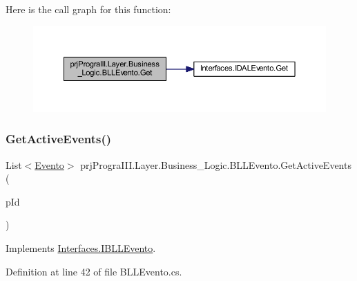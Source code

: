 Here is the call graph for this function\+:
\nopagebreak
\begin{figure}[H]
\begin{center}
\leavevmode
\includegraphics[width=350pt]{classprj_progra_i_i_i_1_1_layer_1_1_business___logic_1_1_b_l_l_evento_a7aeead199812f2510ee3087a7d022c4e_cgraph}
\end{center}
\end{figure}
\hypertarget{classprj_progra_i_i_i_1_1_layer_1_1_business___logic_1_1_b_l_l_evento_a72838525485eaff7c98c698dac7e5f71}{}\label{classprj_progra_i_i_i_1_1_layer_1_1_business___logic_1_1_b_l_l_evento_a72838525485eaff7c98c698dac7e5f71} 
\subsubsection{\texorpdfstring{Get\+Active\+Events()}{GetActiveEvents()}}
{\footnotesize\ttfamily List$<$\hyperlink{classprj_progra_i_i_i_1_1_layer_1_1_entities_1_1_evento}{Evento}$>$ prj\+Progra\+I\+I\+I.\+Layer.\+Business\+\_\+\+Logic.\+B\+L\+L\+Evento.\+Get\+Active\+Events (\begin{DoxyParamCaption}\item[{Date\+Time}]{p\+Id }\end{DoxyParamCaption})}



Implements \hyperlink{interface_interfaces_1_1_i_b_l_l_evento_ace54abf5be3a6b759890104aeebd6d62}{Interfaces.\+I\+B\+L\+L\+Evento}.



Definition at line 42 of file B\+L\+L\+Evento.\+cs.

